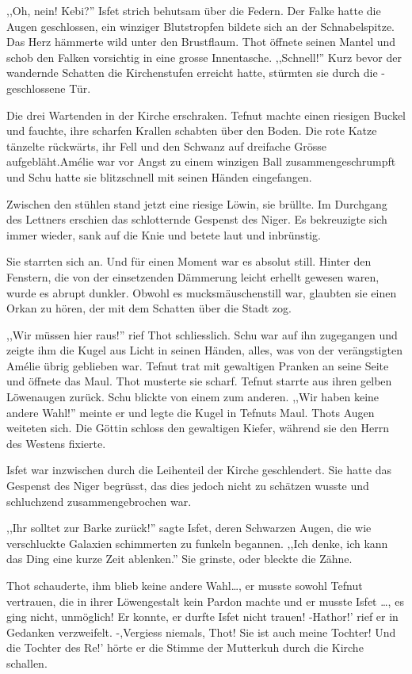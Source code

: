 \documentclass[11pt,titlepage,a5paper]{book}
\begin{document}
,,Oh, nein! Kebi?'' Isfet strich behutsam über die Federn. Der Falke hatte die Augen geschlossen, ein winziger Blutstropfen bildete sich an der Schnabelspitze. Das Herz hämmerte wild unter den Brustflaum. Thot öffnete seinen Mantel und schob den Falken vorsichtig in eine grosse Innentasche. ,,Schnell!'' Kurz bevor der wandernde Schatten die Kirchenstufen erreicht hatte, stürmten sie durch die -geschlossene Tür.

Die drei Wartenden in der Kirche erschraken. Tefnut machte einen riesigen Buckel und fauchte, ihre scharfen Krallen schabten über den Boden. Die rote Katze tänzelte rückwärts, ihr Fell und den Schwanz auf dreifache Grösse aufgebläht.Amélie war vor Angst zu einem winzigen Ball zusammengeschrumpft und Schu hatte sie blitzschnell mit seinen Händen eingefangen.

Zwischen den stühlen stand jetzt eine riesige Löwin, sie brüllte. Im Durchgang des Lettners erschien das schlotternde Gespenst des Niger. Es bekreuzigte sich immer wieder, sank auf die Knie und betete laut und inbrünstig.

Sie starrten sich an. Und für einen Moment war es absolut still. Hinter den Fenstern, die von der einsetzenden Dämmerung leicht erhellt gewesen waren, wurde es abrupt dunkler. Obwohl es mucksmäuschenstill war, glaubten sie einen Orkan zu hören, der mit dem Schatten über die Stadt zog.

,,Wir müssen hier raus!'' rief Thot schliesslich. Schu war auf ihn zugegangen und zeigte ihm die Kugel aus Licht in seinen Händen, alles, was von der verängstigten Amélie übrig geblieben war. Tefnut trat mit gewaltigen Pranken an seine Seite und öffnete das Maul. Thot musterte sie scharf. Tefnut starrte aus ihren gelben Löwenaugen zurück. Schu blickte von einem zum anderen. ,,Wir haben keine andere Wahl!'' meinte er und legte die Kugel in Tefnuts Maul. Thots Augen weiteten sich. Die Göttin schloss den gewaltigen Kiefer, während sie den Herrn des Westens fixierte.

Isfet war inzwischen durch die Leihenteil der Kirche geschlendert. Sie hatte das Gespenst des Niger begrüsst, das dies jedoch nicht zu schätzen wusste und schluchzend zusammengebrochen war.

,,Ihr solltet zur Barke zurück!'' sagte Isfet, deren Schwarzen Augen, die wie verschluckte Galaxien schimmerten zu funkeln begannen. ,,Ich denke, ich kann das Ding eine kurze Zeit ablenken.'' Sie grinste, oder bleckte die Zähne.

Thot schauderte, ihm blieb keine andere Wahl\dots, er musste sowohl Tefnut vertrauen, die in ihrer Löwengestalt kein Pardon machte und er musste Isfet \dots , es ging nicht, unmöglich! Er konnte, er durfte Isfet nicht trauen! -Hathor!' rief er in Gedanken verzweifelt. -,Vergiess niemals, Thot! Sie ist auch meine Tochter! Und die Tochter des Re!' hörte er die Stimme der Mutterkuh durch die Kirche schallen.
\end{document}

